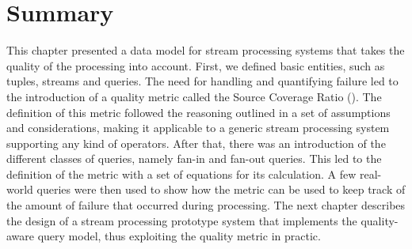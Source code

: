 \section{Summary}

This chapter presented a data model for stream processing systems that takes the quality of the
processing into account.
First, we defined basic entities, such as tuples, streams and queries. The need for handling and
quantifying failure led to the introduction of a quality metric called the Source Coverage Ratio
(\sic). The definition of this metric followed the reasoning outlined in a set of assumptions and
considerations, making it applicable to a generic stream processing system supporting any kind of
operators.
After that, there was an introduction of the different classes of queries, namely fan-in and fan-out
queries.
This led to the definition of the \sic metric with a set of equations for its calculation. A few
real-world queries were then used to show how the metric can be used to keep track
of the amount of failure that occurred during processing.
The next chapter describes the design of a stream processing prototype system that implements the
quality-aware query model, thus exploiting the \sic quality metric in practic.
